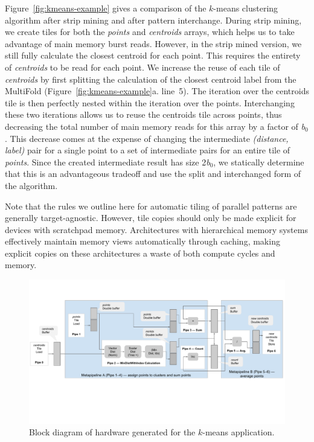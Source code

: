 Figure~\ref{fig:kmeans-example} gives a comparison of the $k$-means clustering
algorithm after strip mining and after pattern interchange. During strip mining,
we create tiles for both the \emph{points} and \emph{centroids} arrays, which
helps us to take advantage of main memory burst reads. However, in the strip
mined version, we still fully calculate the closest centroid for each point.
This requires the entirety of \emph{centroids} to be read for each point.
We increase the reuse of each tile of \emph{centroids} by first splitting
the calculation of the closest centroid label from the MultiFold
(Figure~\ref{fig:kmeans-example}a. line~5). The iteration over the centroids
tile is then perfectly nested within the iteration over the points.
Interchanging these two iterations allows us to reuse the centroids tile across
points, thus decreasing the total number of main memory reads for this array
by a factor of \emph{b$_0$}. This decrease comes
at the expense of changing the intermediate \emph{(distance, label)} pair for a single
point to a set of intermediate pairs for an entire tile of \emph{points}.
Since the created intermediate result
has size 2\emph{b$_0$}, we statically determine that this is an advantageous
tradeoff and use the split and interchanged form of the algorithm.

Note that the rules we outline here for automatic tiling of parallel patterns are
generally target-agnostic. However, tile copies should only be made explicit for devices
with scratchpad memory. Architectures with hierarchical memory systems
effectively maintain memory views automatically through
caching, making explicit copies on these architectures a waste of both
compute cycles and memory.

\begin{figure}
\centering
\includegraphics[width=6in]{3-delite/figs/kmeans-blockdiagram.pdf}
\caption{Block diagram of hardware generated for the $k$-means application.}
\label{fig:metapipelining}
\end{figure}

